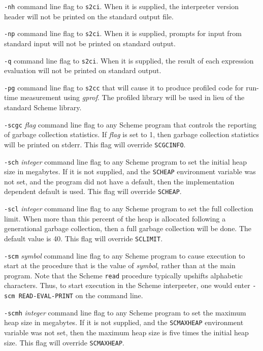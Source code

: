 \documentclass[10pt,twocolumn]{article}
\begin{document}
\texttt{-nh} command line flag to \texttt{s2ci}.  When it is supplied,
the interpreter version header will not be printed on the standard
output file.

\texttt{-np} command line flag to \texttt{s2ci}.  When it is supplied,
prompts for input from standard input will not be printed on standard
output.

\texttt{-q} command line flag to \texttt{s2ci}.  When it is supplied,
the result of each expression evaluation will not be printed on
standard output.

\texttt{-pg} command line flag to \texttt{s2cc} that will cause it to
produce profiled code for run-time measurement using \emph{gprof}.
The profiled library will be used in lieu of the standard Scheme
library.

\texttt{-scgc} \emph{flag} command line flag to any Scheme program
that controls the reporting of garbage collection statistics.  If
\emph{flag} is set to 1, then garbage collection statistics will be
printed on stderr.  This flag will override \texttt{SCGCINFO}.

\texttt{-sch} \emph{integer} command line flag to any Scheme program
to set the initial heap size in megabytes.  If it is not supplied, and
the \texttt{SCHEAP} environment variable was not set, and the program
did not have a default, then the implementation dependent default is
used.  This flag will override \texttt{SCHEAP}.

\texttt{-scl} \emph{integer} command line flag to any Scheme program
to set the full collection limit.  When more than this percent of the
heap is allocated following a generational garbage collection, then a
full garbage collection will be done.  The default value is 40.  This
flag will override \texttt{SCLIMIT}.

\texttt{-scm} \emph{symbol} command line flag to any Scheme program to
cause execution to start at the procedure that is the value of
\emph{symbol}, rather than at the main program.  Note that the Scheme
\texttt{read} procedure typically upshifts alphabetic characters.
Thus, to start execution in the Scheme interpreter, one would enter
\texttt{-scm READ-EVAL-PRINT} on the command line.

\texttt{-scmh} \emph{integer} command line flag to any Scheme program
to set the maximum heap size in megabytes.  If it is not supplied, and
the \texttt{SCMAXHEAP} environment variable was not set, then the
maximum heap size is five times the initial heap size. This flag will
override \texttt{SCMAXHEAP}.
\end{document}
